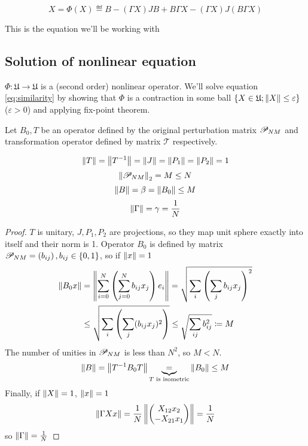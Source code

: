 \documentclass{article}
\begin{document}
\begin{equation}\label{eq:similarity}
    X = \Phi(X) \eqdef B - (\Gamma X) JB + B\Gamma X - (\Gamma X) J(B\Gamma X)
\end{equation}

This is the equation we'll be working with

\subsection{Solution of nonlinear equation}
$\Phi:\mathfrak U\to\mathfrak U$ is a (second order) nonlinear operator.
We'll solve equation \eqref{eq:similarity}
by showing that $\Phi$ is a contraction in some ball $\{ X\in \mathfrak U; \norm{X} \leq \varepsilon \}$ ($\varepsilon>0$)
and applying fix-point theorem.

Let $B_0, T$ be an operator defined by the original perturbation matrix $\perturbmatrix{N}{M}$
and transformation operator defined by matrix $\mathcal T$ respectively.
\begin{lemma}
    $$\norm T = \norm{T^{-1}} = \norm J = \norm{P_1} = \norm{P_2} = 1$$
    $$\normex{2}{\perturbmatrix{N}{M}} = M \leq N$$
    $$\norm B = \beta = \norm{B_0} \leq M$$
    $$\norm{\Gamma} = \gamma = \frac{1}{N}$$
\end{lemma}
\begin{proof}
    $T$ is unitary, $J, P_1, P_2$ are projections, so they map unit sphere exactly into itself and their norm is 1.
    Operator $B_0$ is defined by matrix $\perturbmatrix{N}{M} = \left(b_{ij}\right), b_{ij}\in\{0,1\}$,
    so if $\norm x = 1$
    \[
        \begin{split}
            \norm{B_0 x} &= \norm{\sum_{i=0}^N \left(\sum_{j=0}^N b_{ij} x_j\right) e_i}
            = \sqrt{\sum_i \left(\sum_j b_{ij} x_j\right)^2} \\
            &\leq \sqrt{\sum_i \left(\sum_j (b_{ij} x_j)^2\right)}
            \leq \sqrt{\sum_{ij} b_{ij}^2} \eqdef M
        \end{split}
    \]
The number of unities in $\perturbmatrix{N}{M}$ is less than $N^2$, so $M<N$.
$$\norm B = \norm{T^{-1} B_0 T} \underbrace{=}_{T \text{ is isometric}} \norm{B_0} \leq M$$
    Finally, if $\norm X = 1$, $\norm x = 1$
    $$\norm{\Gamma X x} = \frac1N \norm{\begin{pmatrix}X_{12}x_2 \\ -X_{21}x_1\end{pmatrix}} = \frac1N$$
    so $\norm\Gamma = \frac1N$
\end{proof}
\end{document}
